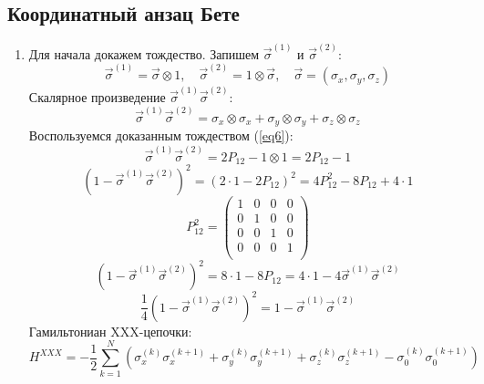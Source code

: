 \documentclass[12pt]{article}
\begin{document}
\subsection{Координатный анзац Бете}
\begin{enumerate}
    \item Для начала докажем тождество. Запишем $\vec{\sigma}^{(1)}$ и $\vec{\sigma}^{(2)}$:
    \begin{equation}
        \vec{\sigma}^{(1)}=\vec{\sigma}\otimes1,\quad \vec{\sigma}^{(2)}=1\otimes\vec{\sigma},\quad \vec{\sigma}=(\sigma_x,\sigma_y,\sigma_z)
    \end{equation}
    Скалярное произведение $\vec{\sigma}^{(1)}\vec{\sigma}^{(2)}$:
    \begin{equation}
        \vec{\sigma}^{(1)}\vec{\sigma}^{(2)}=\sigma_x\otimes\sigma_x+\sigma_y\otimes\sigma_y+\sigma_z\otimes\sigma_z
    \end{equation}
    Воспользуемся доказанным тождеством (\ref{eq6}):
    \begin{equation}
        \vec{\sigma}^{(1)}\vec{\sigma}^{(2)}=2P_{12}-1\otimes1=2P_{12}-1
    \end{equation}
    \begin{equation}
        (1-\vec{\sigma}^{(1)}\vec{\sigma}^{(2)})^2=(2\cdot1-2P_{12})^2=4P^2_{12}-8P_{12}+4\cdot1
    \end{equation}
        \begin{equation}
        P^2_{12}=\left(\begin{array}{cccc}
        1 & 0 & 0 & 0\\
        0 & 1 & 0 & 0\\
        0 & 0 & 1 & 0\\
        0 & 0 & 0 & 1\\
        \end{array}\right)
    \end{equation}
    \begin{equation}
        (1-\vec{\sigma}^{(1)}\vec{\sigma}^{(2)})^2=8\cdot1-8P_{12}=4\cdot1-4\vec{\sigma}^{(1)}\vec{\sigma}^{(2)}
    \end{equation}
    \begin{equation}\label{eq7}
        \boxed{\frac{1}{4}(1-\vec{\sigma}^{(1)}\vec{\sigma}^{(2)})^2=1-\vec{\sigma}^{(1)}\vec{\sigma}^{(2)}}
    \end{equation}
    Гамильтониан XXX-цепочки:
    \begin{equation}
        H^{XXX}=-\frac{1}{2}\sum\limits_{k=1}^N(\sigma_x^{(k)}\sigma_x^{(k+1)}+\sigma_y^{(k)}\sigma_y^{(k+1)}+\sigma_z^{(k)}\sigma_z^{(k+1)}-\sigma_0^{(k)}\sigma_0^{(k+1)})

\end{equation}
\end{enumerate}
\end{document}
